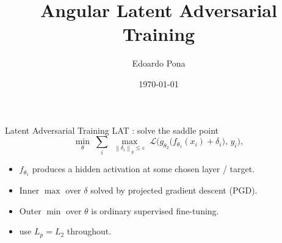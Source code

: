 \documentclass[10pt,aspectratio=169]{beamer}
\title{Angular Latent Adversarial Training}
\author{Edoardo Pona}
\date{\today}
\newcommand{\eps}{\varepsilon}
\newcommand{\norm}[1]{\left\lVert#1\right\rVert}
\begin{document}
\begin{frame}
\titlepage
\end{frame}

\begin{frame}{Latent Adversarial Training}
LAT \citep{casper2024lat}: solve the saddle point
\[
\min_\theta \;\sum_i\; \max_{\norm{\delta_i}_p \le \eps}\; \mathcal{L}\!\big(g_{\theta_2}\!\big(f_{\theta_1}(x_i) + \delta_i\big),\, y_i\big),
\]
\begin{itemize}
\item $f_{\theta_1}$ produces a hidden activation at some chosen layer / target.
\item Inner $\max$ over $\delta$ solved by projected gradient descent (PGD).
\item Outer $\min$ over $\theta$ is ordinary supervised fine-tuning.
\item \citet{casper2024lat} use $L_p = L_2$ throughout.
\end{itemize}
\end{frame}
\end{document}
